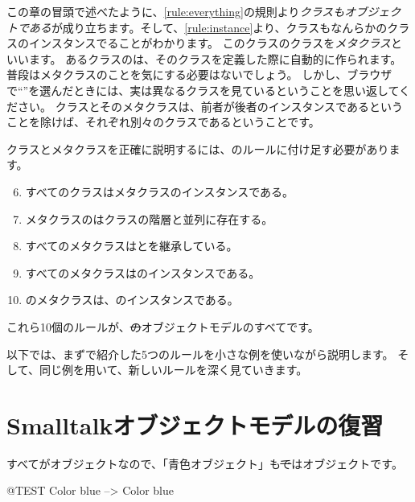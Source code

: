 \documentclass[a4paper,10pt,twoside]{book}
\begin{document}
この章の冒頭で述べたように、\ref{rule:everything}の規則より\emph{クラスもオブジェクトである}が成り立ちます。そして、\ref{rule:instance}より、クラスもなんらかのクラスのインスタンスでることがわかります。
このクラスのクラスを\emph{メタクラス}といいます。
あるクラスのは、そのクラスを定義した際に自動的に作られます。
普段はメタクラスのことを気にする必要はないでしょう。
しかし、ブラウザで``''を選んだときには、実は異なるクラスを見ているということを思い返してください。
クラスとそのメタクラスは、前者が後者のインスタンスであるということを除けば、それぞれ別々のクラスであるということです。

クラスとメタクラスを正確に説明するには、のルールに付け足す必要があります。

\begin{enumerate}[label={\textbf{Rule \arabic{*}}.}, ref={Rule \arabic{*}}, leftmargin=*, widest=10]
\setcounter{enumi}{5}
\item{} 
	すべてのクラスはメタクラスのインスタンスである。

\item{} 
	メタクラスのはクラスの階層と並列に存在する。

\item{} 
	すべてのメタクラスはとを継承している。

\item{} 
	すべてのメタクラスはのインスタンスである。

\item{} 
	のメタクラスは、のインスタンスである。

\end{enumerate}

\noindent
これら10個のルールが、\st のオブジェクトモデルのすべてです。

以下では、まずで紹介した5つのルールを小さな例を使いながら説明します。
そして、同じ例を用いて、新しいルールを深く見ていきます。

\section{Smalltalkオブジェクトモデルの復習}

すべてがオブジェクトなので、「青色オブジェクト」も\st ではオブジェクトです。
\begin{code}{@TEST}
Color blue --> Color blue
\end{code}
\end{document}
